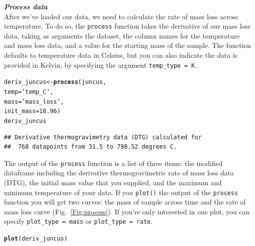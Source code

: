 \documentclass{jors}\usepackage[]{graphicx}\usepackage[]{color}
\makeatletter
\newcommand{\hlnum}[1]{\textcolor[rgb]{0.686,0.059,0.569}{#1}}%
\newcommand{\hlstr}[1]{\textcolor[rgb]{0.192,0.494,0.8}{#1}}%
\newcommand{\hlstd}[1]{\textcolor[rgb]{0.345,0.345,0.345}{#1}}%
\newcommand{\hlkwb}[1]{\textcolor[rgb]{0.69,0.353,0.396}{#1}}%
\newcommand{\hlkwc}[1]{\textcolor[rgb]{0.333,0.667,0.333}{#1}}%
\newcommand{\hlkwd}[1]{\textcolor[rgb]{0.737,0.353,0.396}{\textbf{#1}}}%
\newenvironment{kframe}{%
 \def\at@end@of@kframe{}%
 \ifinner\ifhmode%
  \def\at@end@of@kframe{\end{minipage}}%
  \begin{minipage}{\columnwidth}%
 \fi\fi%
 \def\FrameCommand##1{\hskip\@totalleftmargin \hskip-\fboxsep
 \colorbox{shadecolor}{##1}\hskip-\fboxsep
     \hskip-\linewidth \hskip-\@totalleftmargin \hskip\columnwidth}%
 \MakeFramed {\advance\hsize-\width
   \@totalleftmargin\z@ \linewidth\hsize
   \@setminipage}}%
 {\par\unskip\endMakeFramed%
 \at@end@of@kframe}
\newenvironment{knitrout}{}{} %
\makeatother
\begin{document}
\textbf{\textit{Process data}}\\
After we've loaded our data, we need to calculate the rate of mass loss across temperature. To do so, the \verb|process| function takes the derivative of our mass loss data, taking as arguments the dataset, the column names for the temperature and mass loss data, and a value for the starting mass of the sample. The function defaults to temperature data in Celsius, but you can also indicate the data is provided in Kelvin, by specifying the argument \verb|temp_type = K|.

\begin{knitrout}\footnotesize
{}\color{fgcolor}\begin{kframe}
\begin{alltt}
\hlstd{deriv_juncus} \hlkwb{<-} \hlkwd{process}\hlstd{(juncus,}
                        \hlkwc{temp} \hlstd{=} \hlstr{'temp_C'}\hlstd{,}
                        \hlkwc{mass} \hlstd{=} \hlstr{'mass_loss'}\hlstd{,}
                        \hlkwc{init_mass} \hlstd{=} \hlnum{18.96}\hlstd{)}
\hlstd{deriv_juncus}
\end{alltt}
\begin{verbatim}
## Derivative thermogravimetry data (DTG) calculated for
##  768 datapoints from 31.5 to 798.52 degrees C.
\end{verbatim}
\end{kframe}
\end{knitrout}

The output of the \verb|process| function is a list of three items: the modified dataframe including the derivative thermogravimetric rate of mass loss data (DTG), the initial mass value that you supplied, and the maximum and minimum temperature of your data. If you \verb|plot()| the output of the \verb|process| function you will get two curves: the mass of sample across time and the rate of mass loss curve (Fig.~\ref{Fig:process}). If you're only interested in one plot, you can specify \verb|plot_type = mass| or \verb|plot_type = rate|.

\begin{knitrout}\footnotesize
{}\color{fgcolor}\begin{kframe}
\begin{alltt}
\hlkwd{plot}\hlstd{(deriv_juncus)}
\end{alltt}
\end{kframe}
\end{knitrout}
\end{document}
